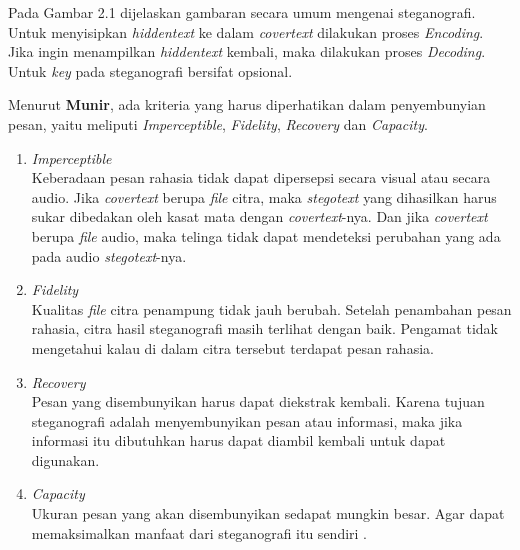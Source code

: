 	Pada Gambar 2.1 dijelaskan gambaran secara umum mengenai steganografi. Untuk menyisipkan \emph{hiddentext} ke dalam \emph{covertext} dilakukan proses \emph{Encoding}. Jika ingin menampilkan \emph{hiddentext} kembali, maka dilakukan proses \emph{Decoding}. Untuk \emph{key} pada steganografi bersifat opsional.
	
	
	Menurut \textbf{Munir}, ada kriteria yang harus diperhatikan dalam penyembunyian pesan, yaitu meliputi \emph{Imperceptible}, \emph{Fidelity}, \emph{Recovery} dan \emph{Capacity}.
	\begin{enumerate}
		\item \emph{Imperceptible}\\ 
		Keberadaan pesan rahasia tidak dapat dipersepsi secara visual atau secara audio. Jika \emph{covertext} berupa \emph{file} citra, maka \emph{stegotext} yang dihasilkan harus sukar dibedakan oleh kasat mata dengan \emph{covertext}-nya. Dan jika \emph{covertext} berupa \emph{file} audio, maka telinga tidak dapat mendeteksi perubahan yang ada pada audio \emph{stegotext}-nya. 
		\item \emph{Fidelity}\\
		Kualitas \emph{file} citra penampung tidak jauh berubah. Setelah penambahan pesan rahasia, citra hasil steganografi masih terlihat dengan baik. Pengamat tidak mengetahui kalau di dalam citra tersebut terdapat pesan rahasia.
		\item \emph{Recovery}\\
		Pesan yang disembunyikan harus dapat diekstrak kembali. Karena tujuan steganografi adalah menyembunyikan pesan atau informasi, maka jika informasi itu dibutuhkan harus dapat diambil kembali untuk dapat digunakan.
		\item \emph{Capacity}\\
		Ukuran pesan yang akan disembunyikan sedapat mungkin besar. Agar dapat memaksimalkan manfaat dari steganografi itu sendiri \cite{munir}.
	\end{enumerate}
	
